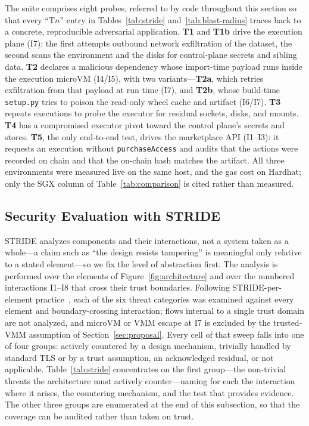 The suite comprises eight probes, referred to by code throughout this section so that every
``T$n$'' entry in Tables~\ref{tab:stride} and~\ref{tab:blast-radius} traces back to a
concrete, reproducible adversarial application. \textbf{T1} and \textbf{T1b} drive the
execution plane (I7): the first attempts outbound network exfiltration of the dataset, the
second scans the environment and the disks for control-plane secrets and sibling data.
\textbf{T2} declares a malicious dependency whose import-time payload runs inside the
execution microVM (I4/I5), with two variants---\textbf{T2a}, which retries exfiltration
from that payload at run time (I7), and \textbf{T2b}, whose build-time \texttt{setup.py}
tries to poison the read-only wheel cache and artifact (I6/I7). \textbf{T3} repeats
executions to probe the executor for residual sockets, disks, and mounts. \textbf{T4} has a
compromised executor pivot toward the control plane's secrets and stores. \textbf{T5}, the
only end-to-end test, drives the marketplace API (I1--I3): it requests an execution without
\texttt{purchaseAccess} and audits that the actions were recorded on chain and that the
on-chain hash matches the artifact. All three environments were measured live on the same
host, and the gas cost on Hardhat; only the SGX column of Table~\ref{tab:comparison} is
cited rather than measured.

\subsection{Security Evaluation with STRIDE}

STRIDE analyzes components and their interactions, not a system taken as a whole---a claim
such as ``the design resists tampering'' is meaningful only relative to a stated
element---so we fix the level of abstraction first. The analysis is performed over the
elements of Figure~\ref{fig:architecture} and over the numbered interactions I1--I8 that
cross their trust boundaries. Following STRIDE-per-element
practice~\cite{shostack2014threat}, each of the six threat categories was examined against
every element and boundary-crossing interaction; flows internal to a single trust domain are
not analyzed, and microVM or VMM escape at I7 is excluded by the trusted-VMM assumption of
Section~\ref{sec:proposal}. Every cell of that sweep falls into one of four groups: actively
countered by a design mechanism, trivially handled by standard TLS or by a trust assumption,
an acknowledged residual, or not applicable. Table~\ref{tab:stride} concentrates on the
first group---the non-trivial threats the architecture must actively counter---naming for
each the interaction where it arises, the countering mechanism, and the test that provides
evidence. The other three groups are enumerated at the end of this subsection, so that the
coverage can be audited rather than taken on trust.

